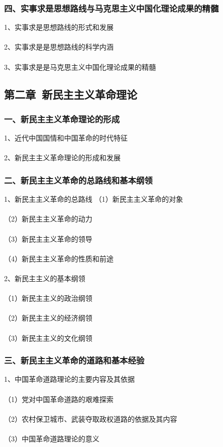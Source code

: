 \documentclass{ctexart}
\begin{document}
\subsubsection{四、实事求是思想路线与马克思主义中国化理论成果的精髓}
1、实事求是思想路线的形式和发展
\\\\

2、实事求是是思想路线的科学内涵
\\\\

3、实事求是是马克思主义中国化理论成果的精髓

\subsection{第二章\ 新民主主义革命理论}
\subsubsection{一、新民主主义革命理论的形成}
1、近代中国国情和中国革命的时代特征
\\\\

2、新民主主义革命理论的形成和发展


\subsubsection{二、新民主主义革命的总路线和基本纲领}
1、新民主主义革命的总路线
（1）新民主主义革命的对象
\\\\
（2）新民主主义革命的动力
\\\\
（3）新民主主义革命的领导
\\\\
（4）新民主主义革命的性质和前途
\\\\

2、新民主主义的基本纲领
\\\\
（1）新民主主义的政治纲领
\\\\
（2）新民主主义的经济纲领
\\\\
（3）新民主主义的文化纲领

\subsubsection{三、新民主主义革命的道路和基本经验}
1、中国革命道路理论的主要内容及其依据
\\\\
（1）党对中国革命道路的艰难探索
\\\\
（2）农村保卫城市、武装夺取政权道路的依据及其内容
\\\\
（3）中国革命道路理论的意义
\\\\
\end{document}
